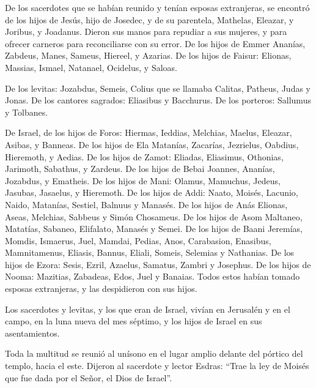  De los sacerdotes que se habían reunido y tenían esposas
extranjeras, se encontró  de los hijos de Jesús, hijo de
Josedec, y de su parentela, Mathelas, Eleazar, y Joribus, y Joadanus.
 Dieron sus manos para repudiar a sus mujeres, y para
ofrecer carneros para reconciliarse con su error.  De los
hijos de Emmer Ananías, Zabdeus, Manes, Sameus, Hiereel, y Azarias.
 De los hijos de Faisur: Elionas, Massias, Ismael,
Natanael, Ocidelus, y Saloas.

 De los levitas: Jozabdus, Semeis, Colius que se llamaba
Calitas, Patheus, Judas y Jonas.  De los cantores
sagrados: Eliasibus y Bacchurus.  De los porteros:
Sallumus y Tolbanes.

 De Israel, de los hijos de Foros: Hiermas, Ieddias,
Melchias, Maelus, Eleazar, Asibas, y Banneas.  De los
hijos de Ela Matanías, Zacarías, Jezrielus, Oabdius, Hieremoth, y
Aedias.  De los hijos de Zamot: Eliadas, Eliasimus,
Othonias, Jarimoth, Sabathus, y Zardeus.  De los hijos de
Bebai Joannes, Ananías, Jozabdus, y Ematheis.  De los
hijos de Mani: Olamus, Mamuchus, Jedeus, Jasubas, Jasaelus, y Hieremoth.
 De los hijos de Addi: Naato, Moisés, Lacunio, Naido,
Matanías, Sestiel, Balnuus y Manasés.  De los hijos de
Anás Elionas, Aseas, Melchias, Sabbeus y Simón Chosameus.
 De los hijos de Asom Maltaneo, Matatías, Sabaneo,
Elifalato, Manasés y Semei.  De los hijos de Baani
Jeremías, Momdis, Ismaerus, Juel, Mamdai, Pedias, Anos, Carabasion,
Enasibus, Mamnitamenus, Eliasis, Bannus, Eliali, Someis, Selemias y
Nathanias. De los hijos de Ezora: Sesis, Ezril, Azaelus, Samatus, Zambri
y Josephus.  De los hijos de Nooma: Mazitias, Zabadeas,
Edos, Juel y Banaias.  Todos estos habían tomado esposas
extranjeras, y las despidieron con sus hijos.

 Los sacerdotes y levitas, y los que eran de Israel,
vivían en Jerusalén y en el campo, en la luna nueva del mes séptimo, y
los hijos de Israel en sus asentamientos.

 Toda la multitud se reunió al unísono en el lugar amplio
delante del pórtico del templo, hacia el este.  Dijeron
al sacerdote y lector Esdras: ``Trae la ley de Moisés que fue dada por
el Señor, el Dios de Israel''.

